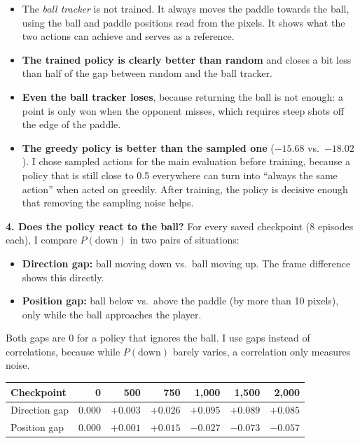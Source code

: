 
\begin{itemize}
  \item The \emph{ball tracker} is not trained. It always moves the paddle towards the ball, using the ball and paddle positions read from the pixels. It shows what the two actions can achieve and serves as a reference.
  \item \textbf{The trained policy is clearly better than random} \pass{} and closes a bit less than half of the gap between random and the ball tracker.
  \item \textbf{Even the ball tracker loses}, because returning the ball is not enough: a point is only won when the opponent misses, which requires steep shots off the edge of the paddle.
  \item \textbf{The greedy policy is better than the sampled one} ($-15.68$ vs.\ $-18.02$). I chose sampled actions for the main evaluation before training, because a policy that is still close to 0.5 everywhere can turn into ``always the same action'' when acted on greedily. After training, the policy is decisive enough that removing the sampling noise helps.
\end{itemize}

\textbf{4. Does the policy react to the ball?} For every saved checkpoint (8 episodes each), I compare $P(\text{down})$ in two pairs of situations:
\begin{itemize}
  \item \textbf{Direction gap:} ball moving down vs.\ ball moving up. The frame difference shows this directly.
  \item \textbf{Position gap:} ball below vs.\ above the paddle (by more than 10 pixels), only while the ball approaches the player.
\end{itemize}
Both gaps are 0 for a policy that ignores the ball. I use gaps instead of correlations, because while $P(\text{down})$ barely varies, a correlation only measures noise.


\begin{center}
\small
\begin{tabular}{@{}l*{6}{r}@{}}
  \toprule
  \textbf{Checkpoint} & 0 & 500 & 750 & 1,000 & 1,500 & 2,000 \\
  \midrule
  Direction gap & 0.000 & $+0.003$ & $+0.026$ & $+0.095$ & $+0.089$ & $\mathbf{+0.085}$ \\
  Position gap & 0.000 & $+0.001$ & $+0.015$ & $-0.027$ & $-0.073$ & $\mathbf{-0.057}$ \\
  \bottomrule
\end{tabular}
\end{center}

